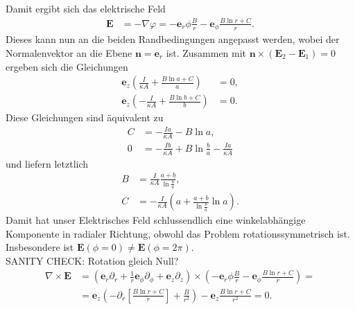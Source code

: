 \documentclass{article}
\renewcommand{\vec}{\boldsymbol}
\begin{document}
Damit ergibt sich das elektrische Feld 
\begin{align*}
    \vec{E} &= -\nabla \varphi = -\vec{e}_r \phi \frac{B}{r} - \vec{e}_\phi \frac{B \ln r + C}{r}.
\end{align*}
Dieses kann nun an die beiden Randbedingungen angepasst werden, wobei der Normalenvektor an die Ebene $\vec{n} = \vec{e}_r$ ist.
Zusammen mit $\vec{n} \times (\vec{E}_2 - \vec{E}_1) = 0$ ergeben sich die Gleichungen
\begin{align*}
    \vec{e}_z \left(\frac{I}{\kappa A} + \frac{B \ln a + C}{a}\right) &= 0, \\
    \vec{e}_z \left(-\frac{I}{\kappa A} + \frac{B \ln b + C}{b}\right) &= 0.
\end{align*}
Diese Gleichungen sind äquivalent zu
\begin{align*}
    C &= -\frac{Ia}{\kappa A} - B\ln a,\\
    0 &= -\frac{Ib}{\kappa A} + B\ln \frac{b}{a} - \frac{Ia}{\kappa A}
\end{align*}
und liefern letztlich
\begin{align*}
    B &= \frac{I}{\kappa A} \frac{a+b}{\ln \frac{b}{a}},\\
    C &= -\frac{I}{\kappa A} \left( a + \frac{a+b}{\ln \frac{b}{a}} \ln a \right).
\end{align*}
Damit hat unser Elektrisches Feld schlussendlich eine winkelabhängige Komponente in radialer Richtung, obwohl das Problem rotationssymmetrisch ist.
Insbesondere ist $\vec{E}(\phi=0) \neq \vec{E}(\phi=2\pi)$.\\
SANITY CHECK: Rotation gleich Null?
\begin{align*}
    \nabla \times \vec{E} &= \left( \vec{e}_r\partial_r + \frac{1}{r}\vec{e}_\phi \partial_\phi + \vec{e}_z\partial_z \right) \times \left( -\vec{e}_r\phi \frac{B}{r} - \vec{e}_\phi \frac{B\ln r + C}{r} \right) = \\
    &= \vec{e}_z \left( -\partial_r \left[ \frac{B\ln r + C}{r} \right] + \frac{B}{r^2} \right) - \vec{e}_z \frac{B\ln r + C}{r^2} = 0.
\end{align*}
\end{document}
